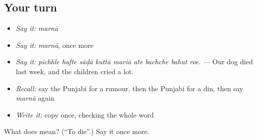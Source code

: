 \subsection*{Your turn}
\begin{itemize}
\raggedright
  \item \emph{Say it:} \emph{marnā}
  \item \emph{Say it:} \emph{marnā}, once more
  \item \emph{Say it:} \emph{pichhle hafte sāḍā kuttā mariā ate bachche bahut roe.} — Our dog died last week, and the children cried a lot.
  \item \emph{Recall:} say the Punjabi for a rumour, then the Punjabi for a din, then say \emph{marnā} again
  \item \emph{Write it:} copy \textbf{} once, checking the whole word
\end{itemize}

\begin{tcolorbox}[breakable,colback=teal!4,colframe=teal!35!black,title={Before you move on}]
What does  mean? (\textquotedblleft{}To die\textquotedblright{}.) Say it once more.
\end{tcolorbox}
